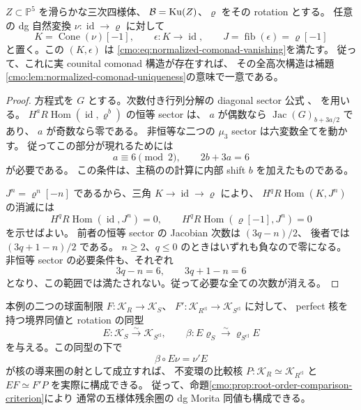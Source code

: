 \begin{proposition}
\label{cmo:prop:cubic-boundary-comonad-vanishing}
$Z\subset\mathbb P^5$ を滑らかな三次四様体、
$\mathcal B=\operatorname{Ku}(Z)$、$\varrho$ をその rotation とする。
任意の dg 自然変換 $\nu:\operatorname{id}\to\varrho$ に対して
\[
 K=\operatorname{Cone}(\nu)[-1],\qquad
 \epsilon:K\to\operatorname{id},\qquad
 J=\operatorname{fib}(\epsilon)=\varrho[-1]
\]
と置く。この $(K,\epsilon)$ は
\eqref{cmo:eq:normalized-comonad-vanishing}を満たす。
従って、これに実 counital comonad 構造が存在すれば、
その全高次構造は補題\ref{cmo:lem:normalized-comonad-uniqueness}の意味で一意である。
\end{proposition}

\begin{proof}
方程式を $G$ とする。次数付き行列分解の diagonal sector 公式
\cite[Theorem~5.39]{NFBFKKernels}、
\cite[Theorem~3.5 and Remark~3.6]{NFLZSerre}を用いる。
$H^aR\operatorname{Hom}(\operatorname{id},\varrho^b)$ の恒等 sector は、
$a$ が偶数なら $\operatorname{Jac}(G)_{b+3a/2}$ であり、
$a$ が奇数なら零である。
非恒等な二つの $\mu_3$ sector は六変数全てを動かす。
従ってこの部分が現れるためには
\[
 a\equiv6\pmod2,\qquad 2b+3a=6
\]
が必要である。
この条件は、主稿のの計算に内部 shift $b$ を加えたものである。

$J^n=\varrho^n[-n]$ であるから、三角 $K\to\operatorname{id}\to\varrho$ により、
$H^qR\operatorname{Hom}(K,J^n)$ の消滅には
\[
 H^qR\operatorname{Hom}(\operatorname{id},J^n)=0,\qquad
 H^qR\operatorname{Hom}(\varrho[-1],J^n)=0
\]
を示せばよい。
前者の恒等 sector の Jacobian 次数は $(3q-n)/2$、
後者では $(3q+1-n)/2$ である。
$n\ge2$、$q\le0$ のときはいずれも負なので零になる。
非恒等 sector の必要条件も、それぞれ
\[
 3q-n=6,\qquad 3q+1-n=6
\]
となり、この範囲では満たされない。従って必要な全ての次数が消える。
\end{proof}

\begin{corollary}
\label{cmo:cor:spherical-unit-reconstruction}
本例の二つの球面制限 $F:\mathcal K_R\to\mathcal K_S$、
$F':\mathcal K_{R^{\mathrm{cl}}}\to\mathcal K_{S^{\mathrm{cl}}}$ に対して、
perfect 核を持つ境界同値と rotation の同型
\[
 E:\mathcal K_S\xrightarrow{\sim}\mathcal K_{S^{\mathrm{cl}}},
 \qquad \beta:E\varrho_S\xrightarrow{\sim}\varrho_{S^{\mathrm{cl}}}E
\]
を与える。この同型の下で
\begin{equation}
\label{cmo:eq:spherical-unit-matching}
 \beta\circ E\nu=\nu' E
\end{equation}
が核の導来圏の射として成立すれば、
不変環の比較核 $P:\mathcal K_R\simeq\mathcal K_{R^{\mathrm{cl}}}$ と
$EF\simeq F'P$ を実際に構成できる。
従って、命題\ref{cmo:prop:root-order-comparison-criterion}により
通常の五様体残余圏の dg Morita 同値も構成できる。
\end{corollary}

